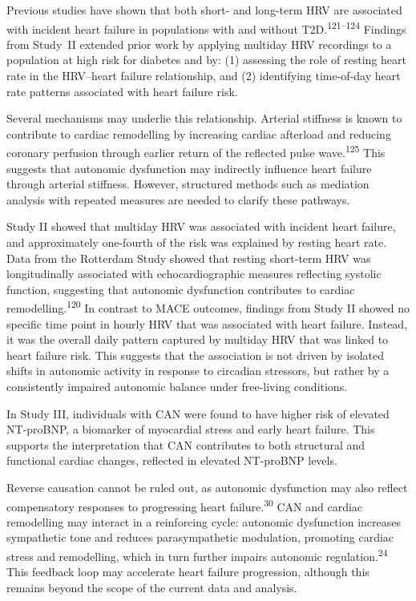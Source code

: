 \documentclass[
  a4paper,
  headsepline=true,
  open=any]{scrbook}
\begin{document}
Previous studies have shown that both short- and long-term HRV are
associated with incident heart failure in populations with and without
T2D.\textsuperscript{121--124} Findings from Study \,II extended prior
work by applying multiday HRV recordings to a population at high risk
for diabetes and by: (1) assessing the role of resting heart rate in the
HRV--heart failure relationship, and (2) identifying time-of-day heart
rate patterns associated with heart failure risk.

Several mechanisms may underlie this relationship. Arterial stiffness is
known to contribute to cardiac remodelling by increasing cardiac
afterload and reducing coronary perfusion through earlier return of the
reflected pulse wave.\textsuperscript{125} This suggests that autonomic
dysfunction may indirectly influence heart failure through arterial
stiffness. However, structured methods such as mediation analysis with
repeated measures are needed to clarify these pathways.

Study II showed that multiday HRV was associated with incident heart
failure, and approximately one-fourth of the risk was explained by
resting heart rate. Data from the Rotterdam Study showed that resting
short-term HRV was longitudinally associated with echocardiographic
measures reflecting systolic function, suggesting that autonomic
dysfunction contributes to cardiac remodelling.\textsuperscript{120} In
contrast to MACE outcomes, findings from Study II showed no specific
time point in hourly HRV that was associated with heart failure.
Instead, it was the overall daily pattern captured by multiday HRV that
was linked to heart failure risk. This suggests that the association is
not driven by isolated shifts in autonomic activity in response to
circadian stressors, but rather by a consistently impaired autonomic
balance under free-living conditions.

In Study III, individuals with CAN were found to have higher risk of
elevated NT-proBNP, a biomarker of myocardial stress and early heart
failure. This supports the interpretation that CAN contributes to both
structural and functional cardiac changes, reflected in elevated
NT-proBNP levels.

Reverse causation cannot be ruled out, as autonomic dysfunction may also
reflect compensatory responses to progressing heart
failure.\textsuperscript{30} CAN and cardiac remodelling may interact in
a reinforcing cycle: autonomic dysfunction increases sympathetic tone
and reduces parasympathetic modulation, promoting cardiac stress and
remodelling, which in turn further impairs autonomic
regulation.\textsuperscript{24} This feedback loop may accelerate heart
failure progression, although this remains beyond the scope of the
current data and analysis.
\end{document}
